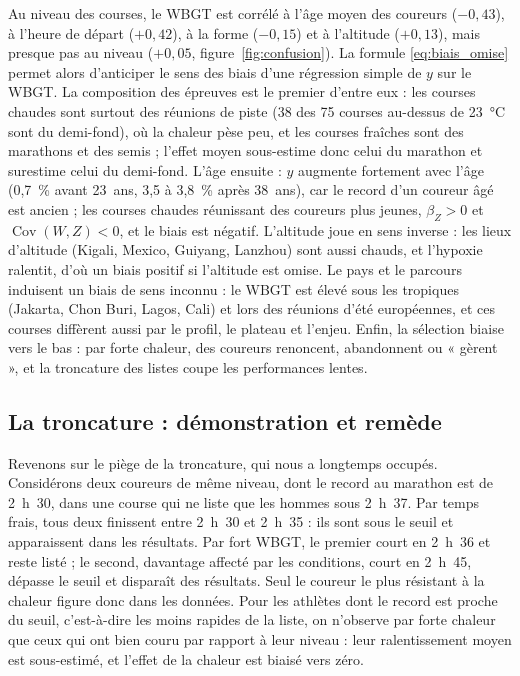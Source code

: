 \documentclass[11pt,a4paper]{article}
\DeclareMathOperator{\Cov}{Cov}
\begin{document}
Au niveau des courses, le WBGT est corrélé à l'âge moyen des coureurs ($-0{,}43$), à l'heure de départ ($+0{,}42$),
à la forme ($-0{,}15$) et à l'altitude ($+0{,}13$), mais presque pas au niveau ($+0{,}05$, figure~\ref{fig:confusion}).
La formule \eqref{eq:biais_omise} permet alors d'anticiper le sens des biais d'une régression simple de $y$ sur le
WBGT. La composition des épreuves est le premier d'entre eux : les courses chaudes sont surtout des réunions de piste
(38 des 75 courses au-dessus de 23~°C sont du demi-fond), où la chaleur pèse peu, et les courses fraîches sont des
marathons et des semis ; l'effet moyen sous-estime donc celui du marathon et surestime celui du demi-fond. L'âge
ensuite : $y$ augmente fortement avec l'âge (0,7~\% avant 23~ans, 3,5 à 3,8~\% après 38~ans), car le record d'un
coureur âgé est ancien ; les courses chaudes réunissant des coureurs plus jeunes, $\beta_Z > 0$ et
$\Cov(W, Z) < 0$, et le biais est négatif. L'altitude joue en sens inverse : les lieux d'altitude (Kigali, Mexico,
Guiyang, Lanzhou) sont aussi chauds, et l'hypoxie ralentit, d'où un biais positif si l'altitude est omise. Le pays et
le parcours induisent un biais de sens inconnu : le WBGT est élevé sous les tropiques (Jakarta, Chon Buri, Lagos,
Cali) et lors des réunions d'été européennes, et ces courses diffèrent aussi par le profil, le plateau et l'enjeu.
Enfin, la sélection biaise vers le bas : par forte chaleur, des coureurs renoncent, abandonnent ou « gèrent », et la
troncature des listes coupe les performances lentes.

\subsection{La troncature : démonstration et remède}\label{sec:troncature}

Revenons sur le piège de la troncature, qui nous a longtemps occupés. Considérons deux coureurs de même niveau, dont
le record au marathon est de 2~h~30, dans une course qui ne liste que les hommes sous 2~h~37. Par temps frais, tous
deux finissent entre 2~h~30 et 2~h~35 : ils sont sous le seuil et apparaissent dans les résultats. Par fort WBGT, le
premier court en 2~h~36 et reste listé ; le second, davantage affecté par les conditions, court en 2~h~45, dépasse le
seuil et disparaît des résultats. Seul le coureur le plus résistant à la chaleur figure donc dans les données. Pour
les athlètes dont le record est proche du seuil, c'est-à-dire les moins rapides de la liste, on n'observe par forte
chaleur que ceux qui ont bien couru par rapport à leur niveau : leur ralentissement moyen est sous-estimé, et l'effet
de la chaleur est biaisé vers zéro.
\end{document}
